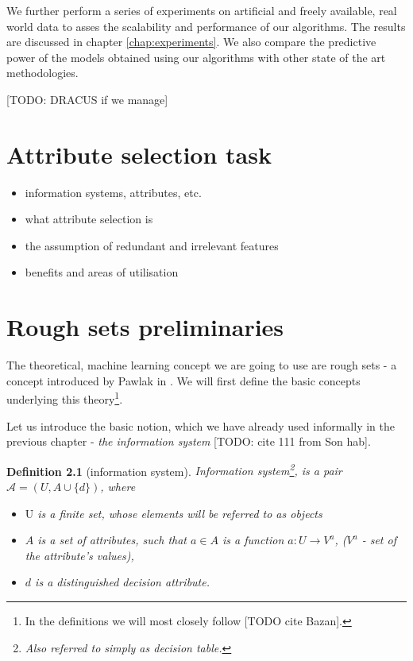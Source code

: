 \documentclass[12pt]{pracamgr}
\newtheorem{definition}{Definition}[chapter]
\begin{document}
We further perform a series of experiments on artificial and freely available, real world data to asses the scalability and performance of our algorithms. The results are discussed in chapter \ref{chap:experiments}. We also compare the predictive power of the models obtained using our algorithms with other state of the art methodologies.

[TODO: DRACUS if we manage]

\chapter{Attribute selection task}
\label{chap:attrsel}

\begin{itemize}
  \item information systems, attributes, etc.
  \item what attribute selection is
  \item the assumption of redundant and irrelevant features
  \item benefits and areas of utilisation
\end{itemize}

\chapter{Rough sets preliminaries}
\label{chap:roughsets}

The theoretical, machine learning concept we are going to use are rough sets - a concept introduced by Pawlak in \cite{pawlak}. We will first define the basic concepts underlying
this theory\footnote{In the definitions we will most closely follow [TODO cite Bazan].}.

Let us introduce the basic notion, which we have already used informally in the previous chapter - \emph{the information system } [TODO: cite 111 from Son hab].

\begin{definition}[information system]

\emph{Information system}\footnote{Also referred to simply as \emph{decision table}.}, is a 
pair $\mathcal{A} = (U, A \cup \{d\})$, where
  \begin{itemize}
    \item $\textrm{U}$ is a finite set, whose elements will be referred to as \emph{objects}
    \item $A$ is a set of \emph{attributes}, such that $a \in A$ is a function
    $a : U \to V^a$, ($V^a$ - set of the attribute's values),
    \item $d$ is a distinguished \emph{decision attribute}.
  \end{itemize}

\end{definition}
\end{document}

